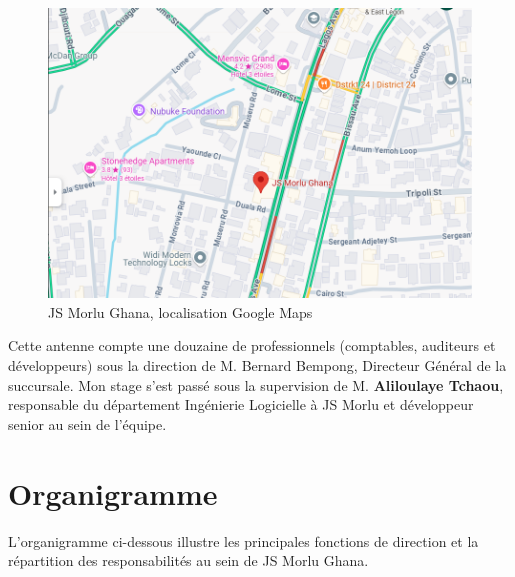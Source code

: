 \begin{figure}[H]
\begin{center}
\includegraphics[width=15cm]{assets/presentation/jsmorlu-map.png}
\end{center}
\caption{JS Morlu Ghana, localisation Google Maps }
\end{figure}

\vspace{0.5cm}

Cette antenne compte une douzaine de professionnels (comptables, auditeurs et développeurs) sous la direction de M. Bernard Bempong, Directeur Général de la succursale. Mon stage s'est passé sous la supervision de M. \textbf{ Aliloulaye Tchaou}, responsable du département Ingénierie Logicielle à JS Morlu et développeur senior au sein de l'équipe.

\section{Organigramme}

L’organigramme ci-dessous illustre les principales fonctions de direction et la répartition des responsabilités au sein de JS Morlu Ghana.

